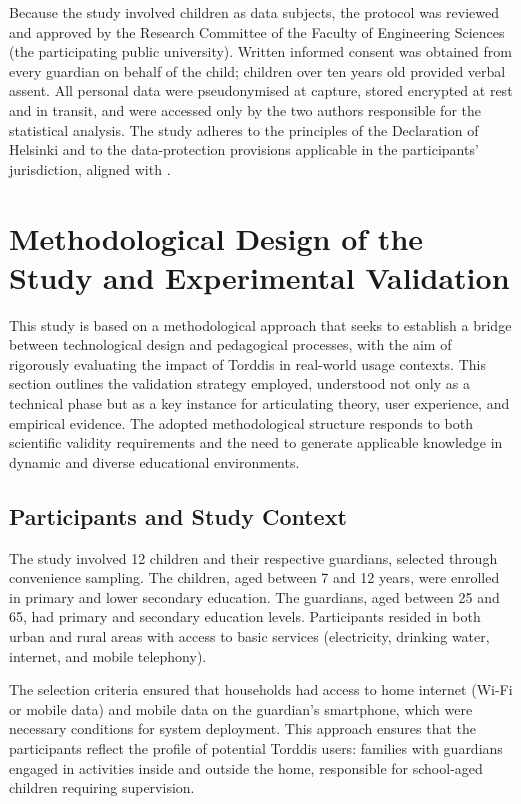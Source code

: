                 Because the study involved children as data subjects, the protocol was reviewed and approved by the Research Committee of the Faculty of Engineering Sciences (the participating public university). Written informed consent was obtained from every guardian on behalf of the child; children over ten years old provided verbal assent. All personal data were pseudonymised at capture, stored encrypted at rest and in transit, and were accessed only by the two authors responsible for the statistical analysis. The study adheres to the principles of the Declaration of Helsinki and to the data-protection provisions applicable in the participants' jurisdiction, aligned with \citet{ISO-IEC27001-2022}.
                
                \section{Methodological Design of the Study and Experimental Validation}
                \label{section:fifth}
                This study is based on a methodological approach that seeks to establish a bridge between technological design and pedagogical processes, with the aim of rigorously evaluating the impact of Torddis in real-world usage contexts. This section outlines the validation strategy employed, understood not only as a technical phase but as a key instance for articulating theory, user experience, and empirical evidence. The adopted methodological structure responds to both scientific validity requirements and the need to generate applicable knowledge in dynamic and diverse educational environments.
                
                \subsection{Participants and Study Context}
                The study involved 12 children and their respective guardians, selected through convenience sampling. The children, aged between 7 and 12 years, were enrolled in primary and lower secondary education. The guardians, aged between 25 and 65, had primary and secondary education levels. Participants resided in both urban and rural areas with access to basic services (electricity, drinking water, internet, and mobile telephony).
                
                The selection criteria ensured that households had access to home internet (Wi-Fi or mobile data) and mobile data on the guardian’s smartphone, which were necessary conditions for system deployment. This approach ensures that the participants reflect the profile of potential Torddis users: families with guardians engaged in activities inside and outside the home, responsible for school-aged children requiring supervision.
                
